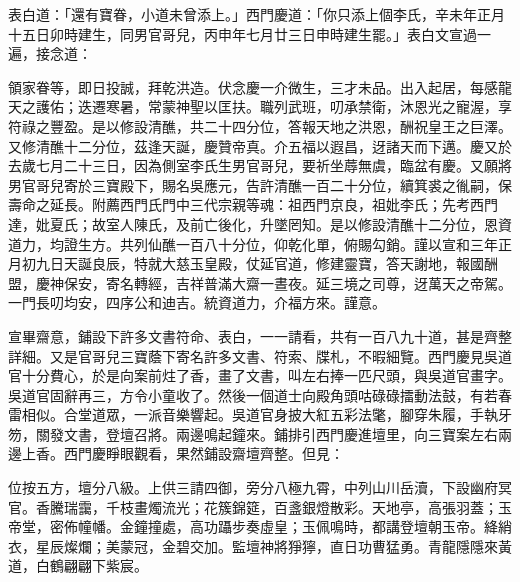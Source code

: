 表白道：「還有寶眷，小道未曾添上。」西門慶道：「你只添上個李氏，辛未年正月十五日卯時建生，同男官哥兒，丙申年七月廿三日申時建生罷。」表白文宣過一遍，接念道：

領家眷等，即日投誠，拜乾洪造。伏念慶一介微生，三才未品。出入起居，每感龍天之護佑；迭遷寒暑，常蒙神聖以匡扶。職列武班，叨承禁衛，沐恩光之寵渥，享符祿之豐盈。是以修設清醮，共二十四分位，答報天地之洪恩，酬祝皇王之巨澤。又修清醮十二分位，茲逢天誕，慶贊帝真。介五福以遐昌，迓諸天而下邁。慶又於去歲七月二十三日，因為側室李氏生男官哥兒，要祈坐蓐無虞，臨盆有慶。又願將男官哥兒寄於三寶殿下，賜名吳應元，告許清醮一百二十分位，續箕裘之㣧嗣，保壽命之延長。附薦西門氏門中三代宗親等魂：祖西門京良，祖妣李氏；先考西門達，妣夏氏；故室人陳氏，及前亡後化，升墜罔知。是以修設清醮十二分位，恩資道力，均證生方。共列仙醮一百八十分位，仰乾化單，俯賜勾銷。謹以宣和三年正月初九日天誕良辰，特就大慈玉皇殿，仗延官道，修建靈寶，答天謝地，報國酬盟，慶神保安，寄名轉經，吉祥普滿大齋一晝夜。延三境之司尊，迓萬天之帝駕。一門長叨均安，四序公和迪吉。統資道力，介福方來。謹意。

宣畢齋意，鋪設下許多文書符命、表白，一一請看，共有一百八九十道，甚是齊整詳細。又是官哥兒三寶蔭下寄名許多文書、符索、牒札，不暇細覽。西門慶見吳道官十分費心，於是向案前炷了香，畫了文書，叫左右捧一匹尺頭，與吳道官畫字。吳道官固辭再三，方令小童收了。然後一個道士向殿角頭咕碌碌擂動法鼓，有若春雷相似。合堂道眾，一派音樂響起。吳道官身披大紅五彩法氅，腳穿朱履，手執牙笏，關發文書，登壇召將。兩邊鳴起鐘來。鋪排引西門慶進壇里，向三寶案左右兩邊上香。西門慶睜眼觀看，果然鋪設齋壇齊整。但見：

位按五方，壇分八級。上供三請四御，旁分八極九霄，中列山川岳瀆，下設幽府冥官。香騰瑞靄，千枝畫燭流光；花簇錦筵，百盞銀燈散彩。天地亭，高張羽蓋；玉帝堂，密佈幢幡。金鐘撞處，高功躡步奏虛皇；玉佩鳴時，都講登壇朝玉帝。絳綃衣，星辰燦爛；美蒙冠，金碧交加。監壇神將猙獰，直日功曹猛勇。青龍隱隱來黃道，白鶴翩翩下紫宸。

